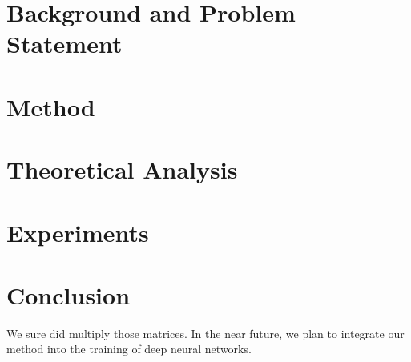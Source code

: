 \documentclass{article}  %
\begin{document}
\section{Background and Problem Statement}



\section{Method}



\section{Theoretical Analysis}



\section{Experiments}




% 


\section{Conclusion}

We sure did multiply those matrices. In the near future, we plan to integrate our method into the training of deep neural networks.
\end{document}
